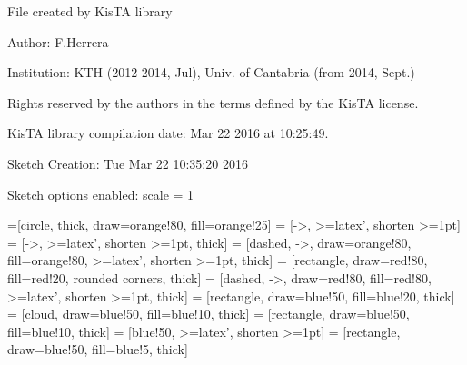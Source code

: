\documentclass[a4paper,10pt]{article}
\begin{document}
File created by KisTA library

Author: F.Herrera

Institution: KTH (2012-2014, Jul), Univ. of Cantabria (from 2014, Sept.)

Rights reserved by the authors in the terms defined by the KisTA license.

KisTA library compilation date: Mar 22 2016 at 10:25:49.



Sketch Creation: Tue Mar 22 10:35:20 2016


Sketch options enabled:
scale = 1
\hfill


=[circle, thick, draw=orange!80, fill=orange!25]
 = [->, >=latex', shorten >=1pt]
 = [->, >=latex', shorten >=1pt, thick]
 = [dashed, ->, draw=orange!80, fill=orange!80, >=latex', shorten >=1pt, thick]
 = [rectangle, draw=red!80, fill=red!20, rounded corners, thick]
 = [dashed, ->, draw=red!80, fill=red!80, >=latex', shorten >=1pt, thick]
 = [rectangle, draw=blue!50, fill=blue!20, thick]
 = [cloud, draw=blue!50, fill=blue!10, thick]
 = [rectangle, draw=blue!50, fill=blue!10, thick]
 = [blue!50, >=latex', shorten >=1pt]
 = [rectangle, draw=blue!50,  fill=blue!5, thick]
\end{document}
